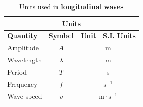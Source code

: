\begin{table}[H]
\begin{center}
\begin{tabular}{|l|c|c|c|}\hline \hline 
\multicolumn{4}{|c|}{\textbf{Units}}\\ \hline \hline
\textbf{Quantity} & \textbf{Symbol} & \textbf{Unit} & \textbf{S.I. Units}\\ \hline
Amplitude & $A$ & \multicolumn{2}{c|}{m} \\ \hline
Wavelength & $\lambda$ & \multicolumn{2}{c|}{m}  \\ \hline
Period & $T$ & \multicolumn{2}{c|}{s}  \\ \hline
Frequency & $f$ & \multicolumn{2}{c|}{$\text{s}^{-1}$}  \\ \hline
Wave speed & $v$ & \multicolumn{2}{c|}{$\text{m} \cdot \text{s}^{-1}$} \\ \hline
\end{tabular}
\end{center}
\caption{Units used in \textbf{longitudinal waves} }
\label{table:electricity::units}
\end{table}
   \label{m38783*cid9}


